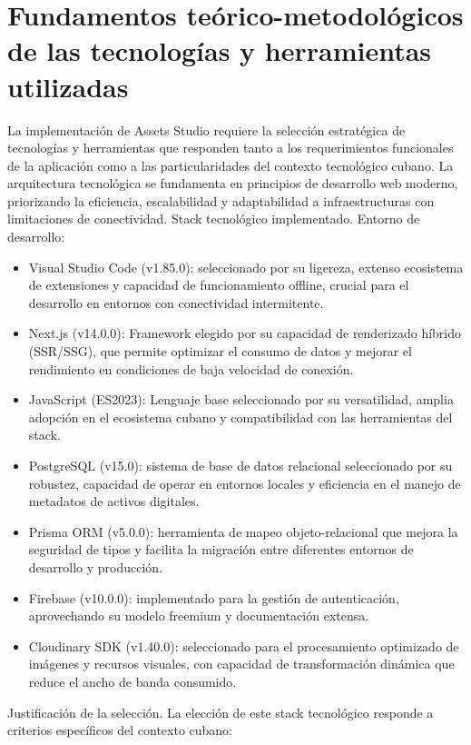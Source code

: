 \section{Fundamentos teórico-metodológicos de las tecnologías y herramientas utilizadas}

La implementación de Assets Studio requiere la selección estratégica de tecnologías y herramientas que responden tanto a los requerimientos funcionales de la aplicación como a las particularidades del contexto tecnológico cubano. La arquitectura tecnológica se fundamenta en principios de desarrollo web moderno, priorizando la eficiencia, escalabilidad y adaptabilidad a infraestructuras con limitaciones de conectividad.
Stack tecnológico implementado.
Entorno de desarrollo:

\begin{itemize}
	\item Visual Studio Code (v1.85.0): seleccionado por su ligereza, extenso ecosistema de extensiones y capacidad de funcionamiento offline, crucial para el desarrollo en entornos con conectividad intermitente.
	\item Next.js (v14.0.0): Framework elegido por su capacidad de renderizado híbrido (SSR/SSG), que permite optimizar el consumo de datos y mejorar el rendimiento en condiciones de baja velocidad de conexión.
	\item JavaScript (ES2023): Lenguaje base seleccionado por su versatilidad, amplia adopción en el ecosistema cubano y compatibilidad con las herramientas del stack.
	\item PostgreSQL (v15.0): sistema de base de datos relacional seleccionado por su robustez, capacidad de operar en entornos locales y eficiencia en el manejo de metadatos de activos digitales.
	\item Prisma ORM (v5.0.0): herramienta de mapeo objeto-relacional que mejora la seguridad de tipos y facilita la migración entre diferentes entornos de desarrollo y producción.
	\item Firebase (v10.0.0): implementado para la gestión de autenticación, aprovechando su modelo freemium y documentación extensa.
	\item Cloudinary SDK (v1.40.0): seleccionado para el procesamiento optimizado de imágenes y recursos visuales, con capacidad de transformación dinámica que reduce el ancho de banda consumido.
\end{itemize}

Justificación de la selección.
La elección de este stack tecnológico responde a criterios específicos del contexto cubano:

